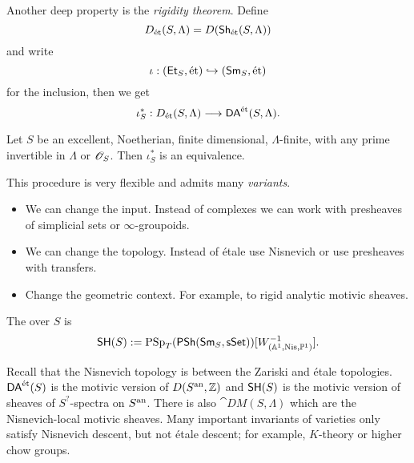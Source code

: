 Another deep property is the \emph{rigidity theorem}. Define
\[
D_{\text{\'et}}(S,\Lambda) = D(\mathsf{Sh}_{\text{\'et}}(S,\Lambda))
\]
and write
\[
\iota : (\mathsf{Et}_S, \text{\'et})\hookrightarrow (\mathsf{Sm}_S,\text{\'et})
\]
for the inclusion, then we get
\[
\iota_S^{*}:D_{\text{\'et}}(S,\Lambda) \to \DAet(S,\Lambda).
\]
\begin{theorem}[Ayoub]
Let $S$ be an excellent, Noetherian, finite dimensional, $\Lambda$-finite, with any prime
invertible in $\Lambda$ or $\mathscr{O}_S$. Then $\iota_S^{*}$ is an equivalence.
\end{theorem}

This procedure is very flexible and admits many \emph{variants}.
\begin{itemize}
\item We can change the input. Instead of complexes we can work with presheaves of
simplicial sets or $\infty$-groupoids.
\item We can change the topology. Instead of \'etale use Nisnevich or use presheaves with transfers.
\item Change the geometric context. For example, to rigid analytic motivic sheaves.
\end{itemize}

\begin{definition}
The  over $S$ is
\[
\mathsf{SH}(S) := \operatorname{PSp}_T(\mathsf{PSh}(\mathsf{Sm}_S,\mathsf{sSet}))[W^{-1}_{(\mathbb A^{1},\text{Nis},\mathbb{P}^{1})}].
\]
\end{definition}
Recall that the Nisnevich topology is between the Zariski and \'etale topologies.
$\mathsf{DA}^\text{\'et}(S)$ is the motivic version of $D(S^\text{an},\mathbb Z)$ and $\mathsf{SH}(S)$ is the motivic version of
sheaves of $S^{?}$-spectra on $S^\text{an}$. There is also $\cat{DM}(S,\Lambda)$ which are the
Nisnevich-local motivic sheaves. Many important invariants of varieties only satisfy
Nisnevich descent, but not \'etale descent; for example, $K$-theory or higher chow groups.

